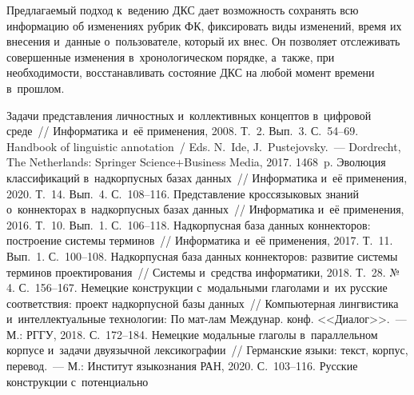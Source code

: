 \begin{multicols}{2}
Предлагаемый подход к~ведению ДКС дает возможность сохранять всю 
информацию об изменениях рубрик ФК, фиксировать виды изменений, время 
их внесения и~данные о~пользователе, который их внес. Он позволяет 
отслеживать совершенные изменения в~хронологическом порядке, а~также, 
при необходимости, восстанавливать состояние ДКС на любой момент 
времени в~прошлом.

\vspace*{-3pt}

{\small\frenchspacing
{%
\begin{thebibliography}{99}

 Задачи представления личностных 
и~коллективных концептов в~цифровой среде~// Информатика и~её применения, 2008. 
Т.~2. Вып.~3. С.~54--69.
Handbook of linguistic annotation~/ Eds. N.~Ide, J.~Pustejovsky.~--- Dordrecht, The 
Netherlands: Springer Science\;+\;Business Media, 2017. 1468~p.
 Эволюция классификаций 
в~надкорпусных базах данных~// Информатика и~её применения, 2020. Т.~14. Вып.~4. 
С.~108--116.
 Представление 
кроссязыковых знаний о~коннекторах в~надкорпусных базах данных~// Информатика 
и~её применения, 2016. Т.~10. Вып.~1. С.~106--118.
 Надкорпусная база данных коннекторов: 
построение системы терминов~// Информатика и~её применения, 2017. Т.~11. Вып.~1. 
С.~100--108.
 Надкорпусная база данных коннекторов: развитие 
системы терминов проектирования~// Системы и~средства информатики, 2018. Т.~28. 
№\,4. С.~156--167.
 Немецкие конструкции с~модальными 
глаголами и~их русские соответствия: проект надкорпусной базы данных~//\linebreak 
Компьютерная лингвистика и~интеллектуальные технологии: По мат-лам Междунар. 
конф. <<Диалог>>.~--- М.: РГГУ, 2018. С.~172--184.
 Немецкие модальные глаголы в~параллельном корпусе и~задачи 
двуязычной лексикографии~// Германские языки: текст, корпус, перевод.~--- М.: Институт 
языкознания РАН, 2020. С.~103--116.
 Русские конструкции с~потенциально 

\end{thebibliography}}}
\end{multicols}
